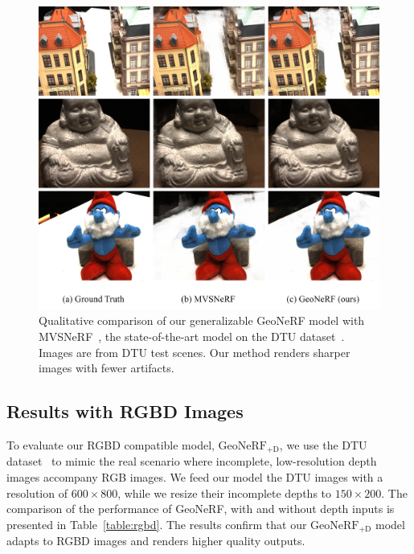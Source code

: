 \FloatBarrier

\begin{figure}[!t]
    \begin{center}
        \includegraphics[width=0.9\linewidth]{images/chapter3/figures/Fig3.jpg}
    \end{center}
   \caption{Qualitative comparison of our generalizable GeoNeRF model with MVSNeRF~\citep{chen2021mvsnerf}, the state-of-the-art model on the DTU dataset~\citep{jensen2014large}. Images are from DTU test scenes. Our method renders sharper images with fewer artifacts.}
    \label{fig:c3_qualitative_dtu}
\end{figure}

\subsection{Results with RGBD Images} \label{sec:c3_rgbd}
To evaluate our RGBD compatible model, $\text{GeoNeRF}_{\text{+D}}$, we use the DTU dataset~\citep{jensen2014large} to mimic the real scenario where incomplete, low-resolution depth images accompany RGB images. We feed our model the DTU images with a resolution of $600 \times 800$, while we resize their incomplete depths to $150 \times 200$. The comparison of the performance of GeoNeRF, with and without depth inputs is presented in Table~\ref{table:rgbd}. The results confirm that our $\text{GeoNeRF}_{\text{+D}}$ model adapts to RGBD images and renders higher quality outputs.

